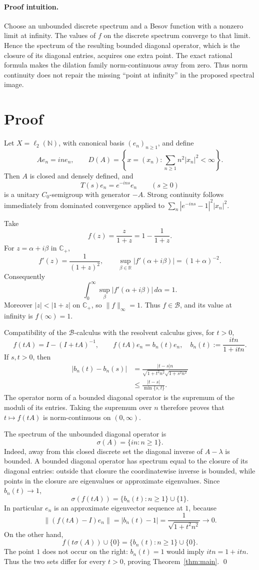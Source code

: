 \documentclass[11pt]{article}
\newcommand{\B}{\mathcal B}
\newcommand{\C}{\mathbb C}
\newcommand{\N}{\mathbb N}
\newcommand{\Hh}{\ell_2(\N)}
\begin{document}
\paragraph{Proof intuition.}
Choose an unbounded discrete spectrum and a Besov function with a nonzero
limit at infinity.  The values of $f$ on the discrete spectrum converge to
that limit.  Hence the spectrum of the resulting bounded diagonal operator,
which is the closure of its diagonal entries, acquires one extra point.
The exact rational formula makes the dilation family norm-continuous away
from zero.  Thus norm continuity does not repair the missing ``point at
infinity'' in the proposed spectral image.

\section{Proof}

Let $X=\Hh$, with canonical basis $(e_n)_{n\ge1}$, and define
\[
 Ae_n=in e_n,\qquad
 D(A)=\left\{x=(x_n):\sum_{n\ge1}n^2|x_n|^2<\infty\right\}.
\]
Then $A$ is closed and densely defined, and
\[
 T(s)e_n=e^{-ins}e_n\qquad(s\ge0)
\]
is a unitary $C_0$-semigroup with generator $-A$.  Strong continuity follows
immediately from dominated convergence applied to
$\sum_n|e^{-ins}-1|^2|x_n|^2$.

Take
\[
 f(z)=\frac{z}{1+z}=1-\frac1{1+z}.
\]
For $z=\alpha+i\beta$ in $\C_+$,
\[
 f'(z)=\frac1{(1+z)^2},\qquad
 \sup_{\beta\in\mathbb R}|f'(\alpha+i\beta)|=(1+\alpha)^{-2}.
\]
Consequently
\[
 \int_0^\infty\sup_\beta|f'(\alpha+i\beta)|\,d\alpha=1.
\]
Moreover $|z|<|1+z|$ on $\C_+$, so $\|f\|_\infty=1$.  Thus $f\in\B$,
and its value at infinity is $f(\infty)=1$.

Compatibility of the $\B$-calculus with the resolvent calculus
\cite[Theorem 1.1(b)]{BGT} gives, for $t>0$,
\[
 f(tA)=I-(I+tA)^{-1},\qquad
 f(tA)e_n=b_n(t)e_n,
 \quad b_n(t):=\frac{itn}{1+itn}.
\]
If $s,t>0$, then
\begin{align*}
 |b_n(t)-b_n(s)|
 &=\frac{|t-s|n}{\sqrt{1+t^2n^2}\sqrt{1+s^2n^2}}\\
 &\le \frac{|t-s|}{\min\{s,t\}}.
\end{align*}
The operator norm of a bounded diagonal operator is the supremum of the
moduli of its entries.  Taking the supremum over $n$ therefore proves that
$t\mapsto f(tA)$ is norm-continuous on $(0,\infty)$.

The spectrum of the unbounded diagonal operator is
\[
 \sigma(A)=\{in:n\ge1\}.
\]
Indeed, away from this closed discrete set the diagonal inverse of
$A-\lambda$ is bounded.  A bounded diagonal operator has spectrum equal to
the closure of its diagonal entries: outside that closure the coordinatewise
inverse is bounded, while points in the closure are eigenvalues or approximate
eigenvalues.  Since $b_n(t)\to1$,
\[
 \sigma(f(tA))=\{b_n(t):n\ge1\}\cup\{1\}.
\]
In particular $e_n$ is an approximate eigenvector sequence at $1$, because
\[
 \|(f(tA)-I)e_n\|=|b_n(t)-1|=\frac1{\sqrt{1+t^2n^2}}\longrightarrow0.
\]
On the other hand,
\[
 f(t\sigma(A))\cup\{0\}=\{b_n(t):n\ge1\}\cup\{0\}.
\]
The point $1$ does not occur on the right: $b_n(t)=1$ would imply
$itn=1+itn$.  Thus the two sets differ for every $t>0$, proving
Theorem~\ref{thm:main}. \qed
\end{document}
